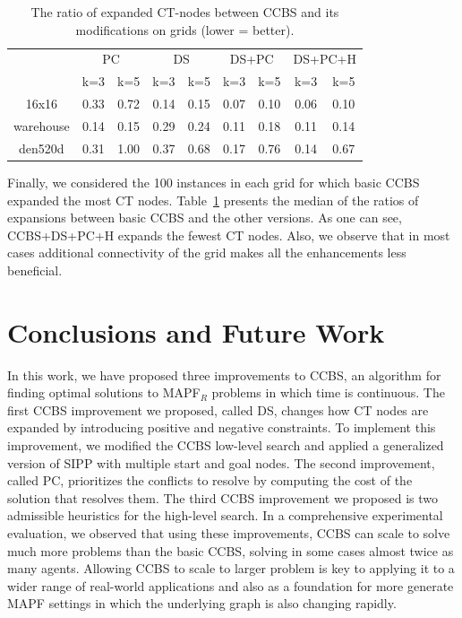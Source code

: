 \documentclass[letterpaper]{article} %
\newcommand{\ccbs}{\ac{CCBS}\xspace}
\newcommand{\ct}{\ac{CT}\xspace}
\newcommand{\sipp}{\ac{SIPP}\xspace}
\newcommand{\mapfr}{{MAPF}$_R$\xspace}
\newcommand{\mapf}{\ac{MAPF}\xspace}
\newcommand{\pc}{\ac{PC}\xspace}
\newcommand{\ds}{\ac{DS}\xspace}
\begin{document}
\begin{table}
\setlength{\tabcolsep}{3pt}
\begin{tabular}{| c | c c | c c | c c | c c |}
\hline
 & \multicolumn{2}{|c|}{PC} & \multicolumn{2}{c|}{DS}& \multicolumn{2}{c|}{DS+PC}& \multicolumn{2}{c|}{DS+PC+H}\\
& k=3 & k=5 & k=3 & k=5 & k=3 & k=5 & k=3 & k=5\\
\hline

16x16 & 0.33 & 0.72 & 0.14 & 0.15 & 0.07 & 0.10 & 0.06 & 0.10 \\
warehouse & 0.14 & 0.15 & 0.29 & 0.24 & 0.11 & 0.18 & 0.11 & 0.14 \\
den520d & 0.31 & 1.00 & 0.37 & 0.68 & 0.17 & 0.76 & 0.14 & 0.67 \\

\hline
\end{tabular}
\caption{The ratio of expanded CT-nodes between \ccbs and its modifications on grids (lower = better).}
\label{TableGridsExpansions}
\vspace{-4mm}
\end{table}

Finally, we considered the 100 instances in each grid for which basic \ccbs expanded the most \ct nodes. 
Table~\ref{TableGridsExpansions} presents the median of the ratios of expansions between basic \ccbs and the other versions. 
As one can see, CCBS+DS+PC+H expands the fewest \ct nodes. Also, we observe that in most cases additional connectivity of the grid makes all the enhancements less beneficial. 

\section{Conclusions and Future Work}
In this work, we have proposed three improvements to \ccbs, an algorithm for finding optimal solutions to \mapfr problems in which time is continuous. 
The first \ccbs improvement we proposed, called \ds, changes how \ct nodes are expanded by introducing positive and negative constraints. 
To implement this improvement, we modified the \ccbs low-level search and applied a generalized version of \sipp with multiple start and goal nodes. 
The second improvement, called \pc, prioritizes the conflicts to resolve by computing the cost of the solution that resolves them. 
The third \ccbs improvement we proposed is two admissible heuristics for the high-level search. 
In a comprehensive experimental evaluation, we observed that using these improvements, \ccbs can scale to solve much more problems than the basic \ccbs, solving in some cases almost twice as many agents. 
Allowing \ccbs to scale to larger problem is key to applying it to a wider range of real-world applications and also as a foundation for more generate \mapf settings in which the underlying graph is also changing rapidly. 
\end{document}
